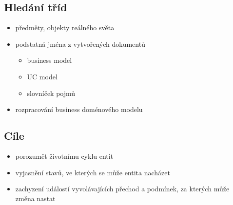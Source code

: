 \documentclass{szzclass}
\begin{document}
\subsection{Hledání tříd}
\begin{itemize}
    \item předměty, objekty reálného světa
    \item podstatná jména z vytvořených dokumentů
    \begin{itemize}
        \item business model
        \item UC model
        \item slovníček pojmů
    \end{itemize}
    \item rozpracování business doménového modelu
\end{itemize}
\subsection{Cíle}
\begin{itemize}
    \item porozumět životnímu cyklu entit
    \item vyjasnění stavů, ve kterých se může entita nacházet
    \item zachyzení událostí vyvolávajících přechod a podmínek, za kterých může změna nastat
\end{itemize}
\end{document}
